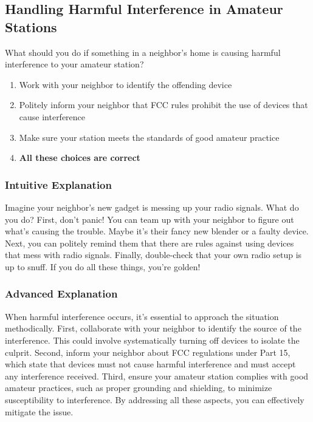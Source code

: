 \subsection{Handling Harmful Interference in Amateur Stations}
\label{T7B08}

\begin{tcolorbox}[colback=gray!10!white,colframe=black!75!black,title=T7B08]
What should you do if something in a neighbor’s home is causing harmful interference to your amateur station?
\begin{enumerate}[label=\Alph*)]
    \item Work with your neighbor to identify the offending device
    \item Politely inform your neighbor that FCC rules prohibit the use of devices that cause interference
    \item Make sure your station meets the standards of good amateur practice
    \item \textbf{All these choices are correct}
\end{enumerate}
\end{tcolorbox}

\subsubsection{Intuitive Explanation}
Imagine your neighbor’s new gadget is messing up your radio signals. What do you do? First, don’t panic! You can team up with your neighbor to figure out what’s causing the trouble. Maybe it’s their fancy new blender or a faulty device. Next, you can politely remind them that there are rules against using devices that mess with radio signals. Finally, double-check that your own radio setup is up to snuff. If you do all these things, you’re golden!

\subsubsection{Advanced Explanation}
When harmful interference occurs, it’s essential to approach the situation methodically. First, collaborate with your neighbor to identify the source of the interference. This could involve systematically turning off devices to isolate the culprit. Second, inform your neighbor about FCC regulations under Part 15, which state that devices must not cause harmful interference and must accept any interference received. Third, ensure your amateur station complies with good amateur practices, such as proper grounding and shielding, to minimize susceptibility to interference. By addressing all these aspects, you can effectively mitigate the issue.

